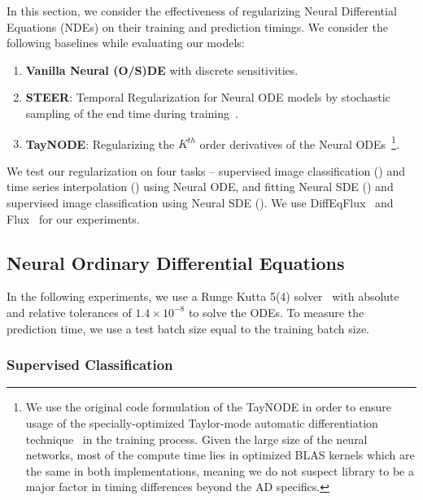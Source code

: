 In this section, we consider the effectiveness of regularizing Neural Differential Equations (NDEs) on their training and prediction timings. We consider the following baselines while evaluating our models:
%
\begin{enumerate}
  \item \textbf{Vanilla Neural (O/S)DE} with discrete sensitivities.
  \item \textbf{STEER}: Temporal Regularization for Neural ODE models by stochastic sampling of the end time during training~\citep{ghosh2020steer}.
  \item \textbf{TayNODE}: Regularizing the $K^{th}$ order derivatives of the Neural ODEs~\citep{kelly2020learning}\footnote{We use the original code formulation of the TayNODE in order to ensure usage of the specially-optimized Taylor-mode automatic differentiation technique~\citep{bettencourt2019taylor} in the training process. Given the large size of the neural networks, most of the compute time lies in optimized BLAS kernels which are the same in both implementations, meaning we do not suspect library to be a major factor in timing differences beyond the AD specifics.}.
\end{enumerate}
%
We test our regularization on four tasks -- supervised image classification () and time series interpolation () using Neural ODE, and fitting Neural SDE () and supervised image classification using Neural SDE (). We use DiffEqFlux~\citep{rackauckas2019diffeqflux} and Flux~\citep{innes2018fashionable} for our experiments.


\subsection{Neural Ordinary Differential Equations}

In the following experiments, we use a Runge Kutta 5(4) solver~\citep{tsitouras2011runge} with absolute and relative tolerances of $1.4 \times 10^{-8}$ to solve the ODEs. To measure the prediction time, we use a test batch size equal to the training batch size.

\subsubsection{Supervised Classification}
\label{subsec:classificationode}

